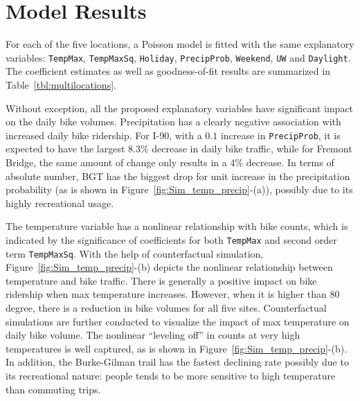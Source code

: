 \documentclass [11pt, proquest] {uwthesis}[2015/03/03]
\begin{document}
\section{Model Results}
For each of the five locations, a Poisson model is fitted with the same explanatory variables:
\texttt{TempMax}, \texttt{TempMaxSq}, \texttt{Holiday}, \texttt{PrecipProb}, \texttt{Weekend}, \texttt{UW} and \texttt{Daylight}. The coefficient estimates as well as goodness-of-fit results are summarized in Table~\ref{tbl:multilocations}.

Without exception, all the proposed explanatory variables have significant impact on the daily bike volumes. Precipitation has a clearly negative association with increased daily bike ridership. For I-90, with a $0.1$ increase in \texttt{PrecipProb}, it is expected to have the largest 8.3\% decrease in daily bike traffic, while for Fremont Bridge, the same amount of change only results in a 4\% decrease. In terms of absolute number, BGT has the biggest drop for unit increase in the precipitation probability (as is shown in Figure~\ref{fig:Sim_temp_precip}-(a)), possibly due to its highly recreational usage. %


The temperature variable has a nonlinear relationship with bike counts, which is indicated by the significance of coefficients for both \texttt{TempMax} and second order term \texttt{TempMaxSq}. With the help of counterfactual simulation, Figure~\ref{fig:Sim_temp_precip}-(b) depicts the nonlinear relationship between temperature and bike traffic. There is generally a positive impact on bike ridership when max temperature increases. However, when it is higher than 80 degree, there is a reduction in bike volumes for all five sites. Counterfactual simulations are further conducted to visualize the impact of max temperature on daily bike volume. The nonlinear ``leveling off'' in counts at very high temperatures is well captured, as is shown in Figure~\ref{fig:Sim_temp_precip}-(b). In addition, the Burke-Gilman trail has the fastest declining rate possibly due to its recreational nature: people tends to be more sensitive to high temperature than commuting trips. 
\end{document}

